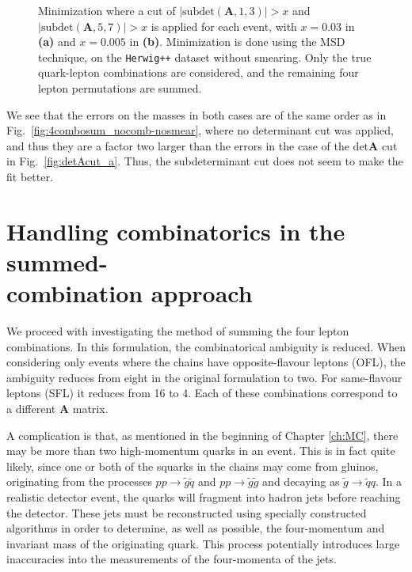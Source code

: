\documentclass[twoside,english]{uiofysmaster}
\begin{document}
\begin{figure}[hbt]
\begin{subfigure}[b]{0.49\textwidth}
    \caption{}
    \label{fig:subdetAcut_b}
  \end{subfigure}
	\caption{Minimization where a cut of $|\mathrm{subdet}(\mathbf A,1,3)| > x$ and $|\mathrm{subdet}(\mathbf A,5,7)| > x$ is applied for each event, with $x = 0.03$ in {\bf (a)} and $x = 0.005$ in {\bf (b)}. Minimization is done using the MSD technique, on the {\tt Herwig++} dataset without smearing. Only the true quark-lepton combinations are considered, and the remaining four lepton permutations are summed.%
	}
	\label{fig:subdetAcut}
\end{figure}
 We see that the errors on the masses in both cases are of the same order as in Fig.\ \ref{fig:4combosum_nocomb-nosmear}, where no determinant cut was applied, and thus they are a factor two larger than the errors in the case of the $\mathrm{det}\mathbf A$ cut in Fig.\ \ref{fig:detAcut_a}. Thus, the subdeterminant cut does not seem to make the fit better.


\section[Handling combinatorics in the summed-combination approach]{Handling combinatorics in the summed-\\combination approach}
\label{sec:handling_combinatorics_summed-combo}
We proceed with investigating the method of summing the four lepton combinations. In this formulation, the combinatorical ambiguity is reduced. When considering only events where the chains have opposite-flavour leptons (OFL), the ambiguity reduces from eight in the original formulation to two. For same-flavour leptons (SFL) it reduces from 16 to 4. Each of these combinations correspond to a different $\mathbf A$ matrix.

A complication is that, as mentioned in the beginning of Chapter \ref{ch:MC}, there may be more than two high-momentum quarks in an event. This is in fact quite likely, since one or both of the squarks in the chains may come from gluinos, originating from the processes $pp \to \tilde g \tilde q$ and $pp \to \tilde g \tilde g$ and decaying as $\tilde g \to \tilde q q$. In a realistic detector event, the quarks will fragment into hadron jets before reaching the detector. These jets must be reconstructed using specially constructed algorithms in order to determine, as well as possible, the four-momentum and invariant mass of the originating quark. This process potentially introduces large inaccuracies into the measurements of the four-momenta of the jets. 
\end{document}
